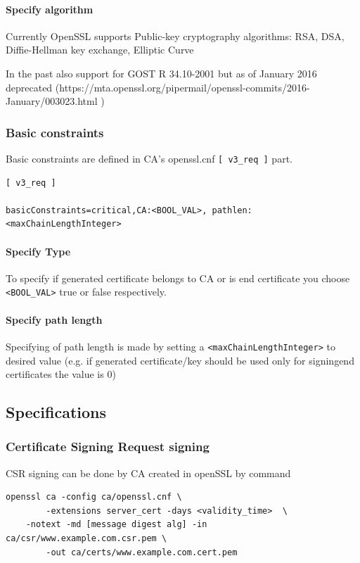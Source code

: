\documentclass[10pt, a4paper]{report}
\begin{document}
      \paragraph{Specify algorithm}
      Currently OpenSSL supports Public-key cryptography algorithms:
      RSA, DSA, Diffie-Hellman key exchange, Elliptic Curve
      
      In the past also support for GOST R 34.10-2001 but as of January 2016 deprecated (https://mta.openssl.org/pipermail/openssl-commits/2016-January/003023.html )
      
      
    \subsubsection{Basic constraints}
    
    Basic constraints are defined in CA's openssl.cnf \verb+[ v3_req ]+ part.
    \begin{verbatim}
[ v3_req ]

basicConstraints=critical,CA:<BOOL_VAL>, pathlen:<maxChainLengthInteger>
    \end{verbatim}

      \paragraph{Specify Type}
To specify if generated certificate belongs to CA or is end certificate you choose \verb+<BOOL_VAL>+ true or false respectively.
      \paragraph{Specify path length}
Specifying of path length is made by setting a \verb+<maxChainLengthInteger>+ to desired value (e.g. if generated certificate/key should be used only for signingend certificates the value is 0)
  \subsection{Specifications}
  
    \subsubsection{Certificate Signing Request signing}
CSR signing can be done by CA created in openSSL by command
\begin{verbatim}
openssl ca -config ca/openssl.cnf \
        -extensions server_cert -days <validity_time>  \
	-notext -md [message digest alg] -in ca/csr/www.example.com.csr.pem \
        -out ca/certs/www.example.com.cert.pem
\end{verbatim}
\end{document}
